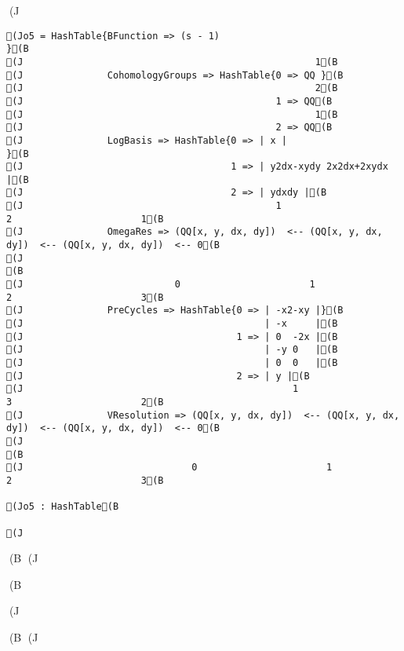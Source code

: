 (J\documentclass{jarticle}(B
\begin{document}
\begin{flushleft}
{\begin{verbatim}
(Jo5 = HashTable{BFunction => (s - 1)                                                                    }(B
(J                                                    1(B
(J               CohomologyGroups => HashTable{0 => QQ }(B
(J                                                    2(B
(J                                             1 => QQ(B
(J                                                    1(B
(J                                             2 => QQ(B
(J               LogBasis => HashTable{0 => | x |                    }(B
(J                                     1 => | y2dx-xydy 2x2dx+2xydx |(B
(J                                     2 => | ydxdy |(B
(J                                             1                       2                       1(B
(J               OmegaRes => (QQ[x, y, dx, dy])  <-- (QQ[x, y, dx, dy])  <-- (QQ[x, y, dx, dy])  <-- 0(B
(J                                                                                                    (B
(J                           0                       1                       2                       3(B
(J               PreCycles => HashTable{0 => | -x2-xy |}(B
(J                                           | -x     |(B
(J                                      1 => | 0  -2x |(B
(J                                           | -y 0   |(B
(J                                           | 0  0   |(B
(J                                      2 => | y |(B
(J                                                1                       3                       2(B
(J               VResolution => (QQ[x, y, dx, dy])  <-- (QQ[x, y, dx, dy])  <-- (QQ[x, y, dx, dy])  <-- 0(B
(J                                                                                                       (B
(J                              0                       1                       2                       3(B

(Jo5 : HashTable(B

(J\end{verbatim}(B
(J}(B

(J\end{flushleft}(B
(J
\end{document}
